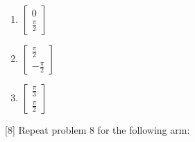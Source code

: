 \documentclass{16384_doc}
\begin{document}
\begin{questions}
\begin{enumerate}[label=\alph*.]
\begin{enumerate} [label=(\roman*)]
            \item \text{[1 point]} $\begin{bmatrix}0 \\ \frac\pi2 \end{bmatrix}$ %
       
            \item \text{[1 point]} $\begin{bmatrix}
                \frac\pi2 \\ -\frac\pi2
            \end{bmatrix}$ %
            
            \item \text{[1 point]} $\begin{bmatrix}
                \frac\pi3 \\ \frac\pi2
            \end{bmatrix}$ %
    
        \end{enumerate}
        \begin{tcolorbox}[height=3cm]
        \end{tcolorbox}
    \end{enumerate}

    [8]
    Repeat problem 8 for the following arm:


\end{questions}
\end{document}
